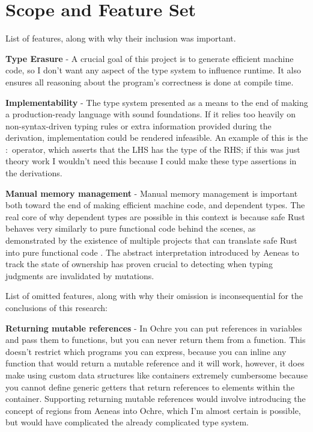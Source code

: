 \documentclass[12pt,twoside]{report}
\begin{document}
\FloatBarrier

\section{Scope and Feature Set}
List of features, along with why their inclusion was important.

\textbf{Type Erasure} - A crucial goal of this project is to generate efficient machine code, so I don't want any aspect of the type system to influence runtime. It also ensures all reasoning about the program's correctness is done at compile time.

\textbf{Implementability} - The type system presented as a means to the end of making a production-ready language with sound foundations. If it relies too heavily on non-syntax-driven typing rules or extra information provided during the derivation, implementation could be rendered infeasible. An example of this is the $:$ operator, which asserts that the LHS has the type of the RHS; if this was just theory work I wouldn't need this because I could make these type assertions in the derivations.

\textbf{Manual memory management} - Manual memory management is important both toward the end of making efficient machine code, and dependent types. The real core of why dependent types are possible in this context is because safe Rust behaves very similarly to pure functional code behind the scenes, as demonstrated by the existence of multiple projects that can translate safe Rust into pure functional code \citep{aeneas}\citep{ullrichKhaElectrolysis2024}. The abstract interpretation introduced by Aeneas to track the state of ownership has proven crucial to detecting when typing judgments are invalidated by mutations.

List of omitted features, along with why their omission is inconsequential for the conclusions of this research:

\textbf{Returning mutable references} - In Ochre you can put references in variables and pass them to functions, but you can never return them from a function. This doesn't restrict which programs you can express, because you can inline any function that would return a mutable reference and it will work, however, it does make using custom data structures like containers extremely cumbersome because you cannot define generic getters that return references to elements within the container. Supporting returning mutable references would involve introducing the concept of regions from Aeneas into Ochre, which I'm almost certain is possible, but would have complicated the already complicated type system.
\end{document}
